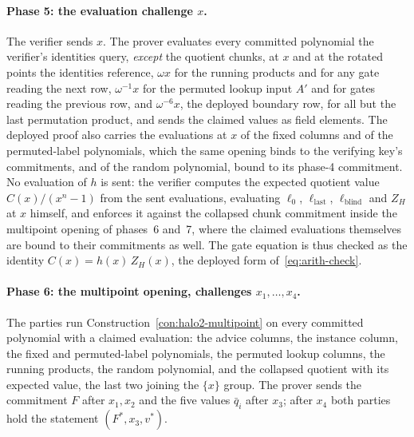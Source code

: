 \documentclass[11pt,a4paper]{article}
\theoremstyle{definition}
\newcommand{\ZH}{Z_H}
\begin{document}
\paragraph{Phase 5: the evaluation challenge $x$.}
The verifier sends $x$. The prover evaluates every committed polynomial
the verifier's identities query, \emph{except} the quotient chunks, at $x$
and at the rotated points the identities reference, $\omega x$ for the
running products and for any gate reading the next row, $\omega^{-1}x$ for
the permuted lookup input $A'$ and for gates reading the previous row, and
$\omega^{-6}x$, the deployed boundary row, for all but the last
permutation product, and sends the claimed values as field elements. The
deployed proof also carries the evaluations at $x$ of the fixed columns
and of the permuted-label polynomials, which the same opening binds to
the verifying key's commitments, and of the random polynomial, bound to
its phase-4 commitment. No evaluation of $h$ is sent: the verifier
computes the expected quotient value
$C(x)/(x^{n} - 1)$ from the sent evaluations, evaluating $\ell_0$,
$\ell_{\mathrm{last}}$, $\ell_{\mathrm{blind}}$ and $\ZH$ at $x$ himself,
and enforces it against the collapsed chunk commitment inside the
multipoint opening of phases~6 and~7, where the claimed evaluations
themselves are bound to their commitments as well. The gate
equation is thus checked as the identity $C(x) = h(x)\,\ZH(x)$, the
deployed form of~\eqref{eq:arith-check}.

\paragraph{Phase 6: the multipoint opening, challenges $x_1, \dots, x_4$.}
The parties run Construction~\ref{con:halo2-multipoint} on every
committed polynomial with a claimed evaluation: the advice columns, the
instance column, the fixed and permuted-label polynomials, the permuted
lookup columns, the running products, the random polynomial, and the
collapsed quotient with its expected value, the last two joining the
$\{x\}$ group. The prover sends the commitment $F$ after $x_1, x_2$ and
the five values $\bar q_i$ after $x_3$; after $x_4$ both parties hold the
statement $(F^{*}, x_3, v^{*})$.
\end{document}
